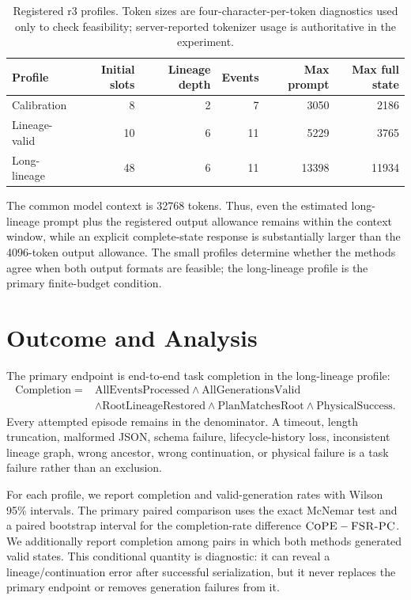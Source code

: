 \documentclass[10pt]{article}
\newcommand{\CoPE}{\textsc{CoPE}}
\newcommand{\FSRPC}{\textsc{FSR-PC}}
\begin{document}
\begin{table}[h]
\centering
\caption{Registered r3 profiles.  Token sizes are four-character-per-token
diagnostics used only to check feasibility; server-reported tokenizer usage is
authoritative in the experiment.}
\label{tab:r3-profiles}
\begin{tabular}{lrrrrr}
\toprule
Profile & Initial slots & Lineage depth & Events & Max prompt & Max full state \\
\midrule
Calibration   &  8 & 2 &  7 &  3050 &  2186 \\
Lineage-valid & 10 & 6 & 11 &  5229 &  3765 \\
Long-lineage  & 48 & 6 & 11 & 13398 & 11934 \\
\bottomrule
\end{tabular}
\end{table}

The common model context is 32768 tokens.  Thus, even the estimated
long-lineage prompt plus the registered output allowance remains within the
context window, while an explicit complete-state response is substantially
larger than the 4096-token output allowance.  The small profiles determine
whether the methods agree when both output formats are feasible; the
long-lineage profile is the primary finite-budget condition.

\section{Outcome and Analysis}

The primary endpoint is end-to-end task completion in the long-lineage profile:
\begin{align}
\mathrm{Completion} ={}&
\mathrm{AllEventsProcessed}
\land \mathrm{AllGenerationsValid} \nonumber\\
&\land \mathrm{RootLineageRestored}
\land \mathrm{PlanMatchesRoot}
\land \mathrm{PhysicalSuccess}.
\end{align}
Every attempted episode remains in the denominator.  A timeout, length
truncation, malformed JSON, schema failure, lifecycle-history loss, inconsistent
lineage graph, wrong ancestor, wrong continuation, or physical failure is a task
failure rather than an exclusion.

For each profile, we report completion and valid-generation rates with Wilson
95\% intervals.  The primary paired comparison uses the exact McNemar test and
a paired bootstrap interval for the completion-rate difference
$\CoPE-\FSRPC$.  We additionally report completion among pairs in which both
methods generated valid states.  This conditional quantity is diagnostic: it
can reveal a lineage/continuation error after successful serialization, but it
never replaces the primary endpoint or removes generation failures from it.
\end{document}
